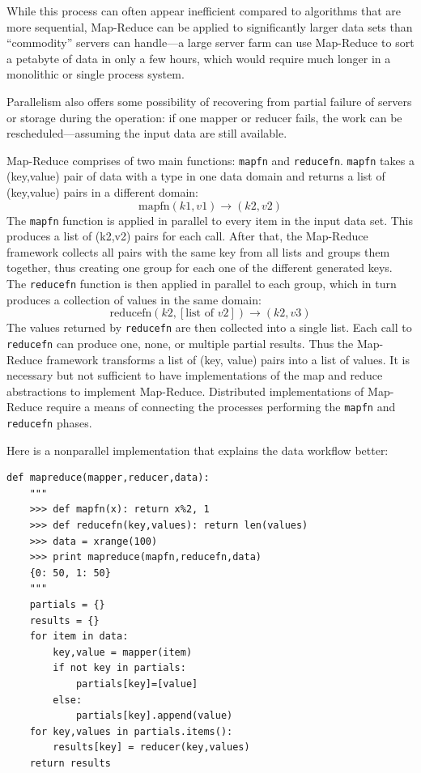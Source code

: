 \documentclass[justified,sixbynine]{tufte-book}
\def\ft{\small\tt}
\theoremstyle{plain}%
\theoremstyle{definition}
\theoremstyle{remark}
\begin{document}
\begin{fullwidth}
While this process can often appear inefficient compared to algorithms that are more sequential, Map-Reduce can be applied to significantly larger data sets than ``commodity'' servers can handle---a large server farm can use Map-Reduce to sort a petabyte of data in only a few hours, which would require much longer in a monolithic or single process system.

Parallelism also offers some possibility of recovering from partial failure of servers or storage during the operation: if one mapper or reducer fails, the work can be rescheduled---assuming the input data are still available.

Map-Reduce comprises of two main functions: {\ft mapfn} and {\ft reducefn}. {\ft mapfn} takes a (key,value) pair of data with a type in one data domain and returns a list of (key,value) pairs in a different domain:
\begin{equation}
\textrm{mapfn}(k1,v1) \rightarrow (k2,v2)
\end{equation}
The {\ft mapfn} function is applied in parallel to every item in the input data set. This produces a list of (k2,v2) pairs for each call. After that, the Map-Reduce framework collects all pairs with the same key from all lists and groups them together, thus creating one group for each one of the different generated keys.
The {\ft reducefn} function is then applied in parallel to each group, which in turn produces a collection of values in the same domain:
\begin{equation}
\textrm{reducefn}(k2, [\textrm{list of }v2]) \rightarrow (k2,v3)
\end{equation}
The values returned by {\ft reducefn} are then collected into a single list. Each call to {\ft reducefn} can produce one, none, or multiple partial results.
Thus the Map-Reduce framework transforms a list of (key, value) pairs into a list of values.
It is necessary but not sufficient to have implementations of the map and reduce abstractions to implement Map-Reduce. Distributed implementations of Map-Reduce require a means of connecting the processes performing the {\ft mapfn} and {\ft reducefn} phases.

Here is a nonparallel implementation that explains the data workflow better:

\begin{lstlisting}
def mapreduce(mapper,reducer,data):
    """
    >>> def mapfn(x): return x%2, 1
    >>> def reducefn(key,values): return len(values)
    >>> data = xrange(100)
    >>> print mapreduce(mapfn,reducefn,data)
    {0: 50, 1: 50}
    """
    partials = {}
    results = {}
    for item in data:
        key,value = mapper(item)
        if not key in partials:
            partials[key]=[value]
        else:
            partials[key].append(value)
    for key,values in partials.items():
        results[key] = reducer(key,values)
    return results
\end{lstlisting}


\end{fullwidth}
\end{document}
